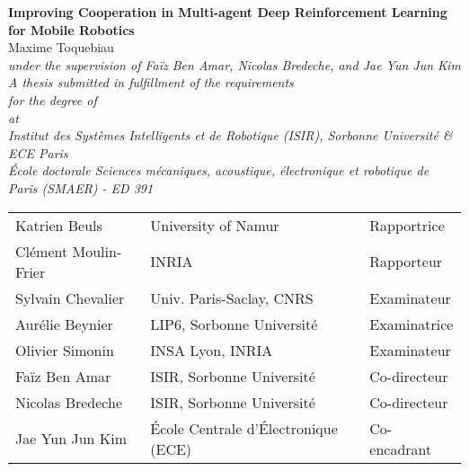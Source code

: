 \documentclass[
11pt, %
english, %
singlespacing, %
parskip, %
headsepline, %
]{MastersDoctoralThesis} %
\begin{document}

 

\begin{titlepage}
\centering
\vspace*{1cm}

{\Huge \textbf{Improving Cooperation in Multi-agent Deep Reinforcement Learning for Mobile Robotics}}\\[1.5cm]

{\Large Maxime Toquebiau}\\[2cm]


{\large \textit{under the supervision of Faïz Ben Amar, Nicolas Bredeche, and Jae Yun Jun Kim}}\\[2cm]

\large \textit{A thesis submitted in fulfillment of the requirements\\ for the degree of \degreename}\\[0.3cm]

\textit{at}\\
\textit{Institut des Systèmes Intelligents et de Robotique (ISIR), Sorbonne Université \& ECE Paris}\\[2cm]
\textit{École doctorale Sciences mécaniques, acoustique, électronique et robotique de Paris (SMAER) - ED 391}\\[2cm]

\begin{tabular}{>{\centering\arraybackslash}p{}%
                >{\centering\arraybackslash}p{}%
                >{\centering\arraybackslash}p{}}
\midrule
Katrien Beuls & University of Namur & Rapportrice \\
Clément Moulin-Frier & INRIA & Rapporteur \\
Sylvain Chevalier & Univ. Paris-Saclay, CNRS & Examinateur \\
Aurélie Beynier & LIP6, Sorbonne Université & Examinatrice \\
Olivier Simonin & INSA Lyon, INRIA & Examinateur \\
Faïz Ben Amar & ISIR, Sorbonne Université & Co-directeur \\
Nicolas Bredeche & ISIR, Sorbonne Université & Co-directeur \\
Jae Yun Jun Kim & École Centrale d'Électronique (ECE) & Co-encadrant \\
\bottomrule
\end{tabular}

\end{titlepage}
\end{document}
